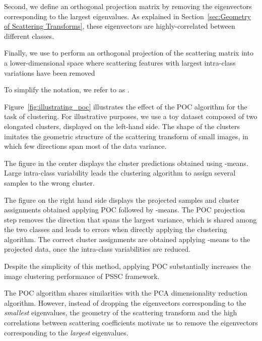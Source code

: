 \documentclass[11pt]{article}
\theoremstyle{definition}
\newcommand{\Figure}[1]{Figure~\ref{#1}}
\newcommand{\Section}[1]{Section~\ref{#1}}
\begin{document}
Second, we define an orthogonal projection matrix   by removing the eigenvectors corresponding to the  largest eigenvalues. As explained in \Section{sec:Geometry of Scattering Transforms}, these eigenvectors are highly-correlated between different classes. 

Finally, we use  to perform an orthogonal projection of the scattering matrix into a lower-dimensional space where scattering features with largest intra-class variations have been removed


To simplify the notation, we refer to  as .

\Figure{fig:illustrating_poc} illustrates the effect of the POC algorithm for the task of clustering. For illustrative purposes, we use a toy dataset composed of two elongated clusters, displayed on the left-hand side. The shape of the clusters imitates the geometric structure of the scattering transform of small images, in which few directions span most of the data variance.

The figure in the center displays the cluster predictions obtained using -means. Large intra-class variability leads the clustering algorithm to assign several samples to the wrong cluster.

The figure on the right hand side displays the projected samples and cluster assignments obtained applying POC followed by -means. 
The POC projection step removes the direction that spans the largest variance, which is shared among the two classes and leads to errors when directly applying the clustering algorithm. 
The correct cluster assignments are obtained applying -means to the projected data, once the intra-class variabilities are reduced.

Despite the simplicity of this method, applying POC substantially increases the image clustering performance of PSSC framework.

The POC algorithm shares similarities with the PCA dimensionality reduction algorithm. However, instead of dropping the eigenvectors corresponding to the \textit{smallest} eigenvalues, the geometry of the scattering transform and the high correlations between scattering coefficients motivate us to remove the eigenvectors corresponding to the \textit{largest} eigenvalues.
\end{document}
